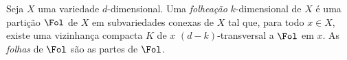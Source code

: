 \begin{defi}
Seja $X$ uma variedade $d$-dimensional. Uma \emph{folheação} $k$-dimensional de $X$ é uma partição $\Fol$
de $X$ em subvariedades conexas de $X$ tal que, para todo $x \in X$, existe uma vizinhança compacta $K$ de $x$ $(d-k)$-transversal a $\Fol$ em $x$. As \emph{folhas} de $\Fol$ são as partes de $\Fol$.
\end{defi}



































\cleardoublepage

